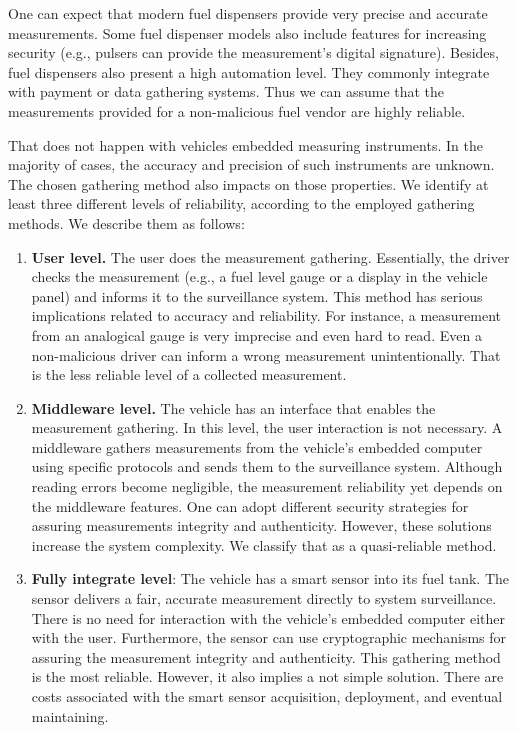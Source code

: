 \documentclass[sigplan]{acmart}
\begin{document}
One can expect that modern fuel dispensers provide very precise and accurate measurements.
Some fuel dispenser models also include features for increasing security (e.g., pulsers can provide the measurement's digital signature).
Besides, fuel dispensers also present a high automation level.
They commonly integrate with payment or data gathering systems.
Thus we can assume that the measurements provided for a non-malicious fuel vendor are highly reliable.

That does not happen with vehicles embedded measuring instruments.
In the majority of cases, the accuracy and precision of such instruments are unknown.
The chosen gathering method also impacts on those properties.
We identify at least three different levels of reliability, according to the employed gathering methods.
We describe them as follows:
\begin{enumerate}
 \item \textbf{User level.} The user does the measurement gathering. 
  Essentially, the driver checks the measurement (e.g., a fuel level gauge or a display in the vehicle panel) and informs it to the surveillance system. 
  This method has serious implications related to accuracy and reliability.
  For instance, a measurement from an analogical gauge is very imprecise and even hard to read.
  Even a non-malicious driver can inform a wrong measurement unintentionally.
  That is the less reliable level of a collected measurement.
  \item \textbf{Middleware level.} The vehicle has an interface that enables the measurement gathering.
  In this level, the user interaction is not necessary.
  A middleware gathers measurements from the vehicle's embedded computer using specific protocols and sends them to the surveillance system.
  Although reading errors become negligible, the measurement reliability yet depends on the middleware features.
  One can adopt different security strategies for assuring measurements integrity and authenticity.
  However, these solutions increase the system complexity.
  We classify that as a quasi-reliable method.
  \item \textbf{Fully integrate level}: The vehicle has a smart sensor into its fuel tank.
  The sensor delivers a fair, accurate measurement directly to system surveillance.
  There is no need for interaction with the vehicle's embedded computer either with the user.
  Furthermore, the sensor can use cryptographic mechanisms for assuring the measurement integrity and authenticity.
  This gathering method is the most reliable.
  However, it also implies a not simple solution.
  There are costs associated with the smart sensor acquisition, deployment, and eventual maintaining.
\end{enumerate}
\end{document}
